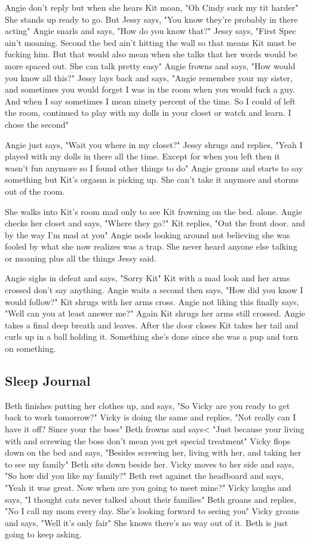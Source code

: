 \documentclass{article}[12px]
\begin{document}
    Angie don't reply but when she hears Kit moan, "Oh Cindy suck my tit harder" She stands up ready to go. But Jessy says, "You know they're probably in there acting" Angie snarls and says, "How do you know that?" Jessy says, "First Spec ain't moaning. Second the bed ain't hitting the wall so that means Kit must be fucking him. But that would also mean when she talks that her words would be more spaced out. She can talk pretty easy" Angie frowns and says, "How would you know all this?" Jessy lays back and says, "Angie remember your my sister, and sometimes you would forget I was in the room when you would fuck a guy. And when I say sometimes I mean ninety percent of the time. So I could of left the room, continued to play with my dolls in your closet or watch and learn. I chose the second"

    Angie just says, "Wait you where in my closet?" Jessy shrugs and replies, "Yeah I played with my dolls in there all the time. Except for when you left then it wasn't fun anymore so I found other things to do" Angie groans and starts to say something but Kit's orgasm is picking up. She can't take it anymore and storms out of the room.

    She walks into Kit's room mad only to see Kit frowning on the bed. alone. Angie checks her closet and says, "Where they go?" Kit replies, "Out the front door. and by the way I'm mad at you" Angie nods looking around not believing she was fooled by what she now realizes was a trap. She never heard anyone else talking or moaning plus all the things Jessy said.

    Angie sighs in defeat and says, "Sorry Kit" Kit with a mad look and her arms crossed don't say anything. Angie waits a second then says, "How did you know I would follow?" Kit shrugs with her arms cross. Angie not liking this finally says, "Well can you at least answer me?" Again Kit shrugs her arms still crossed. Angie takes a final deep breath and leaves. After the door closes Kit takes her tail and curls up in a ball holding it. Something she's done since she was a pup and torn on something.

\subsection {Sleep Journal}
    Beth finishes putting her clothes up, and says, "So Vicky are you ready to get back to work tomorrow?" Vicky is doing the same and replies, "Not really can I have it off? Since your the boss" Beth frowns and says< "Just because your living with and screwing the boss don't mean you get special treatment" Vicky flops down on the bed and says, "Besides screwing her, living with her, and taking her to see my family" Beth sits down beside her. Vicky moves to her side and says, "So how did you like my family?" Beth rest against the headboard and says, "Yeah it was great. Now when are you going to meet mine?" Vicky laughs and says, "I thought cats never talked about their families" Beth groans and replies, "No I call my mom every day. She's looking forward to seeing you" Vicky groans and says, "Well it's only fair" She knows there's no way out of it. Beth is just going to keep asking.\\
\end{document}
